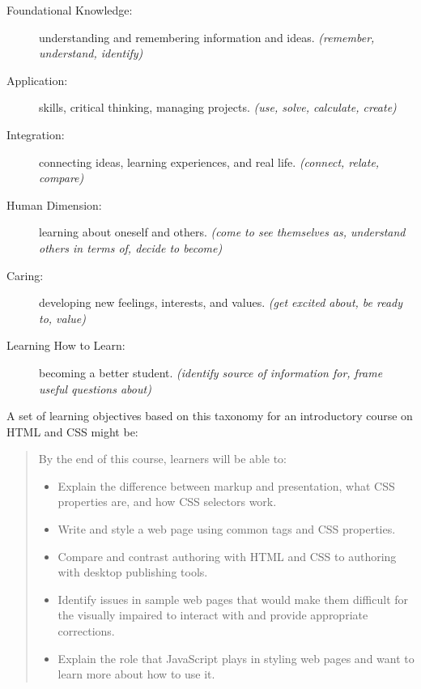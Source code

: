 \begin{description}

  \item[Foundational Knowledge:] understanding and remembering
    information and ideas.
    \emph{(remember, understand, identify)}

  \item[Application:] skills, critical thinking, managing projects.
    \emph{(use, solve, calculate, create)}

  \item[Integration:] connecting ideas, learning experiences, and real
    life.
    \emph{(connect, relate, compare)}

  \item[Human Dimension:] learning about oneself and others.
    \emph{(come to see themselves as, understand others in terms of,
      decide to become)}

  \item[Caring:] developing new feelings, interests, and values.
    \emph{(get excited about, be ready to, value)}

  \item[Learning How to Learn:] becoming a better student.
    \emph{(identify source of information for, frame useful questions
      about)}

\end{description}

\noindent
A set of learning objectives based on this taxonomy for an
introductory course on HTML and CSS might be:

\begin{quote}
  By the end of this course, learners will be able to:

  \begin{itemize}

  \item
    Explain the difference between markup and presentation, what CSS
    properties are, and how CSS selectors work.

  \item
    Write and style a web page using common tags and CSS properties.

  \item
    Compare and contrast authoring with HTML and CSS to authoring with
    desktop publishing tools.

  \item
    Identify issues in sample web pages that would make them difficult
    for the visually impaired to interact with and provide appropriate
    corrections.

  \item
    Explain the role that JavaScript plays in styling web pages and
    want to learn more about how to use it.

  \end{itemize}
\end{quote}

